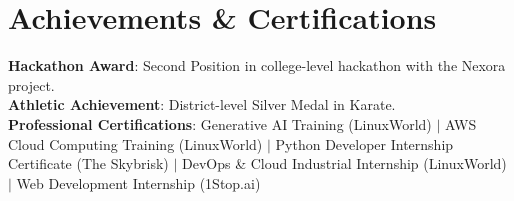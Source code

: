 \documentclass[letterpaper,10pt]{article}
\begin{document}
\section{Achievements \& Certifications}
 \begin{itemize}[leftmargin=0.15in, label={}]
    \small{\item{
     \textbf{Hackathon Award}{: Second Position in college-level hackathon with the Nexora project.} \\
     \textbf{Athletic Achievement}{: District-level Silver Medal in Karate.} \\
     \textbf{Professional Certifications}{: Generative AI Training (LinuxWorld) $|$ AWS Cloud Computing Training (LinuxWorld) $|$ Python Developer Internship Certificate (The Skybrisk) $|$ DevOps \& Cloud Industrial Internship (LinuxWorld) $|$ Web Development Internship (1Stop.ai)}
    }}
 \end{itemize}
\end{document}
